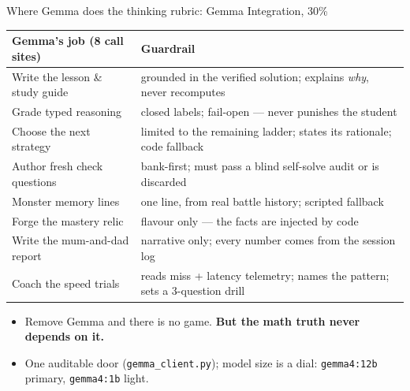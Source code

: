 \documentclass[aspectratio=169,11pt]{beamer}
\begin{document}
\begin{frame}{Where Gemma does the thinking \hfill {\normalsize\color{muted}rubric: Gemma Integration, 30\%}}
  \renewcommand{\arraystretch}{1.15}
  {\scriptsize
  \begin{tabular}{@{}p{4.0cm}p{9.3cm}@{}}
    \toprule
    \textbf{Gemma's job (8 call sites)} & \textbf{Guardrail} \\
    \midrule
    Write the lesson \& study guide & grounded in the verified solution; explains \emph{why}, never recomputes \\
    Grade typed reasoning & closed labels; fail-open --- never punishes the student \\
    Choose the next strategy & limited to the remaining ladder; states its rationale; code fallback \\
    Author fresh check questions & bank-first; must pass a blind self-solve audit or is discarded \\
    Monster memory lines & one line, from real battle history; scripted fallback \\
    Forge the mastery relic & flavour only --- the facts are injected by code \\
    Write the mum-and-dad report & narrative only; every number comes from the session log \\
    Coach the speed trials & reads miss + latency telemetry; names the pattern; sets a 3-question drill \\
    \bottomrule
  \end{tabular}}
  \vspace{0.25em}
  \begin{itemize}\setlength\itemsep{0.15em}
    \item {\small Remove Gemma and there is no game. \textbf{But the math truth never depends on it.}}
    \item {\small One auditable door (\texttt{gemma\_client.py}); model size is a dial: \texttt{gemma4:12b} primary, \texttt{gemma4:1b} light.}
  \end{itemize}
\end{frame}
\end{document}
